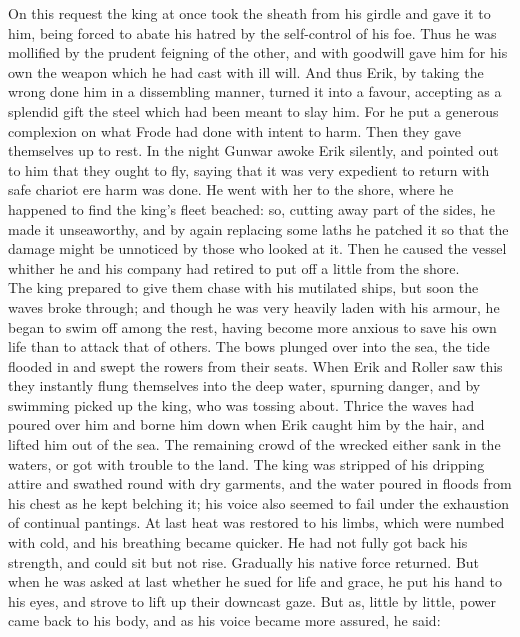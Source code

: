 \documentclass[10pt,a4paper]{report}
\begin{document}
On this request the king at once took the sheath from his girdle and gave it to him, being forced to abate his hatred by the self-control of his foe. Thus he was mollified by the prudent feigning of the other, and with goodwill gave him for his own the weapon which he had cast with ill will. And thus Erik, by taking the wrong done him in a dissembling manner, turned it into a favour, accepting as a splendid gift the steel which had been meant to slay him. For he put a generous complexion on what Frode had done with intent to harm. Then they gave themselves up to rest. In the night Gunwar awoke Erik silently, and pointed out to him that they ought to fly, saying that it was very expedient to return with safe chariot ere harm was done. He went with her to the shore, where he happened to find the king's fleet beached: so, cutting away part of the sides, he made it unseaworthy, and by again replacing some laths he patched it so that the damage might be unnoticed by those who looked at it. Then he caused the vessel whither he and his company had retired to put off a little from the shore.\\

The king prepared to give them chase with his mutilated ships, but soon the waves broke through; and though he was very heavily laden with his armour, he began to swim off among the rest, having become more anxious to save his own life than to attack that of others. The bows plunged over into the sea, the tide flooded in and swept the rowers from their seats. When Erik and Roller saw this they instantly flung themselves into the deep water, spurning danger, and by swimming picked up the king, who was tossing about. Thrice the waves had poured over him and borne him down when Erik caught him by the hair, and lifted him out of the sea. The remaining crowd of the wrecked either sank in the waters, or got with trouble to the land. The king was stripped of his dripping attire and swathed round with dry garments, and the water poured in floods from his chest as he kept belching it; his voice also seemed to fail under the exhaustion of continual pantings. At last heat was restored to his limbs, which were numbed with cold, and his breathing became quicker. He had not fully got back his strength, and could sit but not rise. Gradually his native force returned. But when he was asked at last whether he sued for life and grace, he put his hand to his eyes, and strove to lift up their downcast gaze. But as, little by little, power came back to his body, and as his voice became more assured, he said:\\
\end{document}
